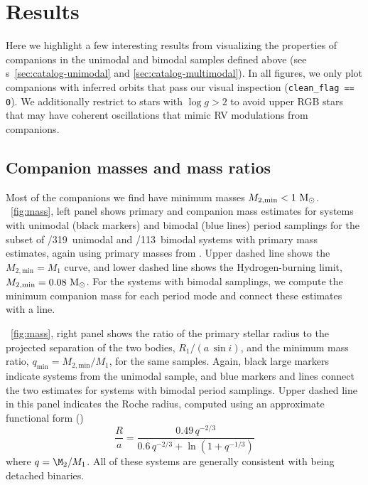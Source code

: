 \documentclass[modern, letterpaper]{aastex62}
\newcommand{\nbimodal}{113}
\newcommand{\nunimodal}{319}
\begin{document}


\section{Results}
\label{sec:results}

Here we highlight a few interesting results from visualizing the properties of
companions in the unimodal and bimodal samples defined above (see \sectionname
s~\ref{sec:catalog-unimodal} and \ref{sec:catalog-multimodal}).
In all figures, we only plot companions with inferred orbits that pass our
visual inspection (\texttt{clean\_flag == 0}).
We additionally restrict to stars with $\log g > 2$ to avoid upper RGB stars
that may have coherent oscillations that mimic RV modulations from companions.

\subsection{Companion masses and mass ratios}

Most of the companions we find have minimum masses $M_{2, \textrm{min}} <
1~\mathrm{M}_\odot$.
\figurename~\ref{fig:mass}, left panel shows primary and companion mass
estimates for systems with unimodal (black markers) and bimodal (blue lines)
period samplings for the subset of /\nunimodal\ unimodal and /\nbimodal\ bimodal
systems with primary mass estimates, again using primary masses from
\citet{Ness:2015}.
Upper dashed line shows the $M_{2, \textrm{min}} = M_1$ curve, and lower dashed
line shows the Hydrogen-burning limit, $M_{2, \textrm{min}} = 0.08~\mathrm{M}_\odot$.
For the systems with bimodal samplings, we compute the minimum companion mass
for each period mode and connect these estimates with a line.

\figurename~\ref{fig:mass}, right panel shows the ratio of the primary stellar
radius to the projected separation of the two bodies, $R_1 / (a\,\sin i)$, and
the minimum mass ratio, $q_{\textrm{min}} = M_{2, \textrm{min}} / M_1$, for the
same samples.
Again, black large markers indicate systems from the unimodal sample, and blue
markers and lines connect the two estimates for systems with bimodal period
samplings.
Upper dashed line in this panel indicates the Roche radius, computed using an
approximate functional form (\citealt{Eggleton:1983})
\begin{equation}
    \frac{R}{a} = \frac{0.49\,q^{-2/3}}{0.6\,q^{-2/3} +
        \ln\left(1 + q^{-1/3}\right)}
\end{equation}
where $q = \M_2 / M_1$.
All of these systems are generally consistent with being detached binaries.
\end{document}
